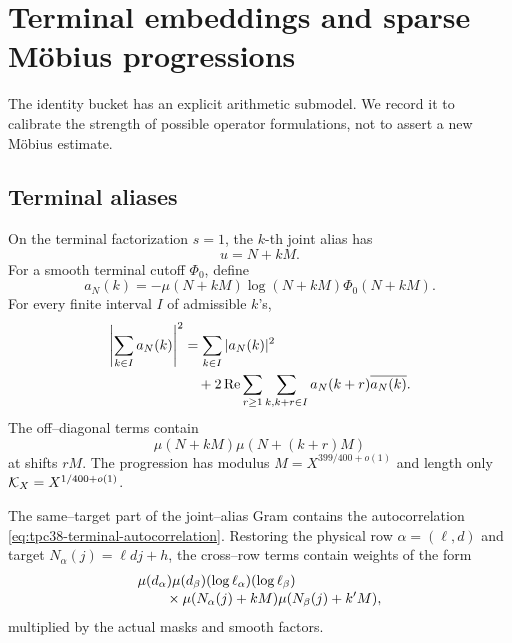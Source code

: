 \section{Terminal embeddings and sparse M\"obius progressions}
\label{sec:tpc38-terminal-boundary}

The identity bucket has an explicit arithmetic submodel.  We record it to
calibrate the strength of possible operator formulations, not to assert a
new M\"obius estimate.

\subsection{Terminal aliases}

On the terminal factorization \(s=1\), the \(k\)-th joint alias has
\begin{equation}
 u=N+kM.
 \label{eq:tpc38-terminal-alias}
\end{equation}
For a smooth terminal cutoff \(\Phi_0\), define
\begin{equation}
 a_N(k)
 =-\mu(N+kM)\log(N+kM)\Phi_0(N+kM).
 \label{eq:tpc38-terminal-alias-sequence}
\end{equation}
For every finite interval \(I\) of admissible \(k\)'s,
\begin{align}
 \left|\sum_{k\in I}a_N(k)\right|^2
 &=\sum_{k\in I}|a_N(k)|^2
 \notag\\
 &\quad+2\operatorname{Re}
 \sum_{r\ge1}
 \sum_{\substack{k,k+r\in I}}
 a_N(k+r)\overline{a_N(k)}.
 \label{eq:tpc38-terminal-autocorrelation}
\end{align}
The off--diagonal terms contain
\begin{equation}
 \mu(N+kM)\mu(N+(k+r)M)
 \label{eq:tpc38-M-spaced-Mobius}
\end{equation}
at shifts \(rM\).  The progression has modulus
\(M=X^{399/400+o(1)}\) and length only
\(\mathcal K_X=X^{1/400+o(1)}\).

\begin{proposition}
\label{prop:tpc38-terminal-alias-content}
The same--target part of the joint--alias Gram contains the autocorrelation
\eqref{eq:tpc38-terminal-autocorrelation}.  Restoring the physical row
\(\alpha=(\ell,d)\) and target \(N_\alpha(j)=\ell dj+h\), the cross--row
terms contain weights of the form
\begin{align}
 &\mu(d_\alpha)\mu(d_\beta)
 (\log\ell_\alpha)(\log\ell_\beta)
 \notag\\[-0.2em]
 &\qquad\times
 \mu(N_\alpha(j)+kM)
 \mu(N_\beta(j)+k'M),
 \label{eq:tpc38-four-Mobius-row-kernel}
\end{align}
multiplied by the actual masks and smooth factors.
\end{proposition}


